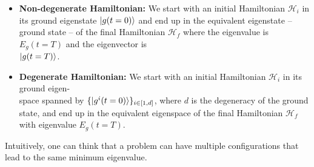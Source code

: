 \begin{itemize}
    \item \textbf{Non-degenerate Hamiltonian:} We start with an initial Hamiltonian $\mathcal{H}_{i}$ in its ground eigenstate $\ket{g(t=0)}$ and end up in the equivalent eigenstate -- ground state -- of the final Hamiltonian $\mathcal{H}_{f}$ where the eigenvalue is $E_{g}(t=T)$ and the eigenvector is\\
    $\ket{g(t=T)}$.
    \item \textbf{Degenerate Hamiltonian:} We start with an initial Hamiltonian $\mathcal{H}_{i}$ in its ground eigen-\\
    space spanned by $\{\ket{g^{i}(t=0)}\}_{i \in \left[1,d\right]}$, where $d$ is the degeneracy of the ground state, and end up in the equivalent eigenspace of the final Hamiltonian $\mathcal{H}_{f}$ with eigenvalue $E_{g}(t=T)$.
\end{itemize}
Intuitively, one can think that a problem can have multiple configurations that lead to the same minimum eigenvalue.
